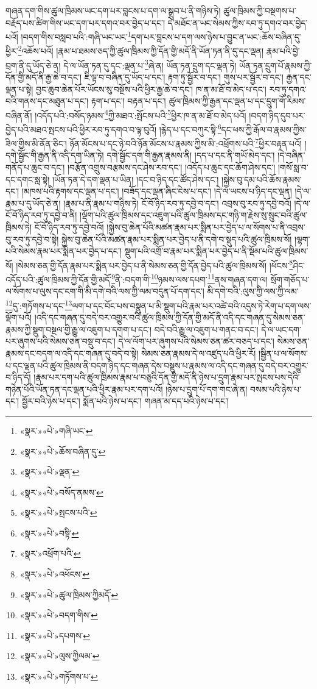 གཞན་དག་གིས་ཚུལ་ཁྲིམས་ཡང་དག་པར་བླངས་པ་དག་ལ་སྒྲུབ་པ་ནི་གཉིས་ཏེ། ཚུལ་ཁྲིམས་ཀྱི་བསྔགས་པ་བརྗོད་པས་ཚིག་གིས་ཡང་དག་པར་དགའ་བར་བྱེད་པ་དང་། དེ་མཐོང་ན་ཡང་སེམས་ཀྱིས་རབ་ཏུ་དགའ་བར་བྱེད་པའོ། །བདག་གིས་བསླབ་པའི་:གཞི་ཡང་ཡང་\footnote{«སྣར་»«པེ་»གཞི་ཡང་}དག་པར་བླངས་པ་དག་ལས་ཉེས་པ་བྱུང་ན་ཡང་:ཆོས་བཞིན་དུ་ཕྱིར་\footnote{«སྣར་»«པེ་»ཆོས་བཞིན་དུ་}འཆོས་པའོ། །རྣམ་པ་ཐམས་ཅད་ཀྱི་ཚུལ་ཁྲིམས་ཀྱི་དོན་གྱི་མདོ་ནི་ཡོན་ཏན་ནི་དུ་དང་ལྡན། རྣམ་པའི་བྱེ་བྲག་ནི་དུ་ཡོད་ཅེ་ན། དེ་ལ་ཡོན་ཏན་དུ་དང་:ལྡན་པ་\footnote{«སྣར་»«པེ་»ལྡན་}ཞེ་ན། ཡོན་ཏན་དྲུག་དང་ལྡན་ཏེ། ཡོན་ཏན་དྲུག་པོ་རྣམས་ཀྱི་དོན་གྱི་མདོ་ནི་རྒྱ་ཆེ་བ་དང་། ཇི་ལྟ་བ་བཞིན་དུ་ཡོད་པ་དང་། རྟག་ཏུ་སྦྱོར་བ་དང་། གུས་པར་སྦྱོར་བ་དང་། རྒྱན་དང་ལྡན་པ་སྟེ། བྱང་ཆུབ་ཆེན་པོར་ཡོངས་སུ་བསྔོས་པའི་ཕྱིར་རྒྱ་ཆེ་བ་དང་། ཁ་ན་མ་ཐོ་བ་མེད་པ་དང་། རབ་ཏུ་དགའ་བའི་གནས་དང་མཐུན་པ་དང་། རྟག་པ་དང་། བརྟན་པ་དང་། ཚུལ་ཁྲིམས་ཀྱི་རྒྱན་དང་ལྡན་པ་དང་དྲུག་གོ་རིམས་བཞིན་ནོ། །འདོད་པའི་:བསོད་ཉམས་\footnote{«སྣར་»«པེ་»བསོད་ནམས་}ཀྱི་མཐའ་:སྤོངས་པའི་\footnote{«སྣར་»«པེ་»སྤངས་པའི་}ཕྱིར་ཁ་ན་མ་ཐོ་བ་མེད་པའོ། །བདག་ཉིད་དུབ་པར་བྱེད་པའི་མཐའ་སྤངས་པའི་ཕྱིར་རབ་ཏུ་དགའ་བ་ལྟ་བུའོ། །རྙེད་པ་དང་བཀུར་སྟི་\footnote{«སྣར་»«པེ་»བསྟི་}དང་ཕས་ཀྱི་རྒོལ་བ་རྣམས་ཀྱིས་ཟིལ་གྱིས་མི་ནོན་ཅིང་། ཉོན་མོངས་པ་དང་ཉེ་བའི་ཉོན་མོངས་པ་རྣམས་ཀྱིས་མི་:འཕྲོགས་པའི་\footnote{«སྣར་»འཕྲོག་པའི་}ཕྱིར་བརྟན་པའོ། །དགེ་སྦྱོང་གི་རྒྱན་ནི་འདི་དག་ཡིན་ཏེ། དགེ་སྦྱོང་དག་གི་རྒྱན་རྣམས་ནི། །དད་པ་དང་ནི་གཡོ་མེད་དང་། །དེ་བཞིན་གནོད་པ་ཆུང་བ་དང་། །བརྩོན་འགྲུས་བརྩམས་དང་ཤེས་རབ་དང་། །འདོད་པ་ཆུང་དང་ཆོག་ཤེས་དང་། །གསོ་སླ་བ་དང་དགང་སླ་སྟེ། །ཡོན་ཏན་དེ་དག་ལྡན་པ་ཡིན། །དང་བ་ཉིད་དང་ཚོད་ཤེས་དང་། །སྐྱེས་བུ་དམ་པའི་ཆོས་རྣམས་དང་། །མཁས་པའི་རྟགས་དང་ལྡན་པ་དང་། །བཟོད་དང་ལྡན་ཞིང་ངེས་པ་དང་། །དེ་ལ་ཡངས་པ་ཉིད་དང་ལྡན། །དེ་ལ་རྣམ་པ་དུ་ཡོད་ཅེ་ན། །རྣམ་པ་ནི་རྣམ་པ་གཉིས་ཏེ། ངོ་བོ་ཉིད་རབ་ཏུ་དབྱེ་བ་དང་། འབྲས་བུ་རབ་ཏུ་དབྱེ་བའོ། །དེ་ལ་ངོ་བོ་ཉིད་རབ་ཏུ་དབྱེ་བ་ནི། །ལྡོག་པའི་ཚུལ་ཁྲིམས་དང་འཇུག་པའི་ཚུལ་ཁྲིམས་དང་གཉི་ག་རྗེས་སུ་སྲུང་བའི་ཚུལ་ཁྲིམས་ཏེ། ངོ་བོ་ཉིད་རབ་ཏུ་དབྱེ་བའོ། །སྐྱེས་བུ་ཆེན་པོའི་མཚན་རྣམ་པར་སྨིན་པར་བྱེད་པ་ལ་སོགས་པ་ནི་འབྲས་བུ་རབ་ཏུ་དབྱེ་བ་སྟེ། སྐྱེས་བུ་ཆེན་པོའི་མཚན་རྣམ་པར་སྨིན་པར་བྱེད་པ་ནི་དགེ་བ་སྡུད་པའི་ཚུལ་ཁྲིམས་སོ། །ལྷག་པའི་སེམས་རྣམ་པར་སྨིན་པར་བྱེད་པ་དང་། སྡུག་པའི་འགྲོ་བ་རྣམ་པར་སྨིན་པར་བྱེད་པ་ནི་སྡོམ་པའི་ཚུལ་ཁྲིམས་སོ། །སེམས་ཅན་གྱི་དོན་རྣམ་པར་སྨིན་པར་བྱེད་པ་ནི་སེམས་ཅན་གྱི་དོན་བྱེད་པའི་ཚུལ་ཁྲིམས་སོ། །ཕོངས་\footnote{«སྣར་»«པེ་»འཕོངས་}ཤིང་འདོད་པའི་:ཚུལ་ཁྲིམས་ཀྱི་དོན་གྱི་མདོ་\footnote{«སྣར་»«པེ་»ཚུལ་ཁྲིམས་ཀྱིམདོ་}ནི་:བདག་གི་\footnote{«སྣར་»«པེ་»བདག་གིས་}ཉམས་ལས་དཔག་\footnote{«སྣར་»«པེ་»དཔགས་}ནས་གཞན་དག་ལ། སྲོག་གཅོད་པ་ལ་སོགས་པ་ལུས་དང་ངག་གི་མི་དགེ་བའི་ལས་ཀྱི་ལམ་བདུན་པོ་དག་དང་། མི་དགེ་བའི་:ལུས་ཀྱི་ལས་ཀྱི་ལམ་\footnote{«སྣར་»«པེ་»ལུས་ཀྱིལམ་}དུ་:གཏོགས་པ་དང་\footnote{«སྣར་»«པེ་»གཏོགས་པ་}ལག་པ་དང་བོང་པས་བསྣུན་པ་མི་སྡུག་པའི་རྣམ་པར་འཚེ་བའི་འདུས་ཏེ་རེག་པ་དག་ལས་ལྡོག་པའོ། །འདི་དང་གཞན་དུ་བདེ་བར་འགྱུར་བའི་ཚུལ་ཁྲིམས་ཀྱི་དོན་གྱི་མདོ་ནི་འདི་དང་གཞན་དུ་སེམས་ཅན་རྣམས་ཀྱི་སྡུག་བསྔལ་གྱི་རྒྱུ་ལ་འཇུག་པ་དགག་པ་དང་། བདེ་བའི་རྒྱུ་ལ་འཇུག་པ་གནང་བ་དང་། དེ་ལ་ཡང་དག་པར་ཞུགས་པའི་སེམས་ཅན་བསྡུ་བ་དང་། དེ་ལ་ལོག་པར་ཞུགས་པའི་སེམས་ཅན་ཚར་བཅད་པ་དང་། སེམས་ཅན་རྣམས་དང་བདག་ལ་འདི་དང་གཞན་དུ་བདེ་བ་སྟེ། སེམས་ཅན་རྣམས་དེ་ལ་འཛུད་པའི་ཕྱིར་རོ། །སྦྱིན་པ་ལ་སོགས་པ་དང་ལྡན་པའི་ཚུལ་ཁྲིམས་ནི་བདག་ཉིད་དང་གཞན་དེས་བསྡུས་པ་རྣམས་ལ་འདི་དང་གཞན་དུ་བདེ་བར་འགྱུར་བ་ཉིད་དོ། །རྣམ་པར་དག་པའི་ཚུལ་ཁྲིམས་རྣམ་པ་བཅུའི་དོན་གྱི་མདོ་ནི་ཉེས་པ་དྲུག་རྣམ་པར་སྤངས་པས་དེའི་གཉེན་པོའི་ཡོན་ཏན་དང་ལྡན་པའི་ཕྱིར་རྣམ་པར་དག་པའོ། །ཉེས་པ་དྲུག་པོ་དག་གང་ཞེ་ན། བསམ་པའི་ཉེས་པ་དང་། སྦྱོར་བའི་ཉེས་པ་དང་། སྨོན་པའི་ཉེས་པ་དང་། གཞན་མ་དད་པའི་ཉེས་པ་དང་། 